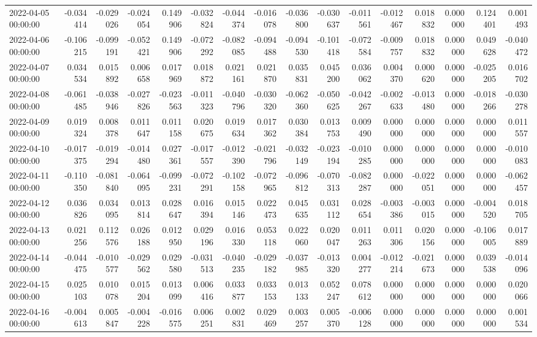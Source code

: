 \begin{tabular}{lrrrrrrrrrrrrrrr}
2022-04-05 00:00:00 & -0.034414 & -0.029026 & -0.024054 & 0.149906 & -0.032824 & -0.044374 & -0.016078 & -0.036800 & -0.030637 & -0.011561 & -0.012467 & 0.018832 & 0.000000 & 0.124401 & 0.001493 \\
2022-04-06 00:00:00 & -0.106215 & -0.099191 & -0.052421 & 0.149906 & -0.072292 & -0.082085 & -0.094488 & -0.094530 & -0.101418 & -0.072584 & -0.009757 & 0.018832 & 0.000000 & 0.049628 & -0.040472 \\
2022-04-07 00:00:00 & 0.034534 & 0.015892 & 0.006658 & 0.017969 & 0.018872 & 0.021161 & 0.021870 & 0.035831 & 0.045200 & 0.036062 & 0.004370 & 0.000620 & 0.000000 & -0.025205 & 0.016702 \\
2022-04-08 00:00:00 & -0.061485 & -0.038946 & -0.027826 & -0.023563 & -0.011323 & -0.040796 & -0.030320 & -0.062360 & -0.050625 & -0.042267 & -0.002633 & -0.013480 & 0.000000 & -0.018266 & -0.030278 \\
2022-04-09 00:00:00 & 0.019324 & 0.008378 & 0.011647 & 0.011158 & 0.020675 & 0.019634 & 0.017362 & 0.030384 & 0.013753 & 0.009490 & 0.000000 & 0.000000 & 0.000000 & 0.000000 & 0.011557 \\
2022-04-10 00:00:00 & -0.017375 & -0.019294 & -0.014480 & 0.027361 & -0.017557 & -0.012390 & -0.021796 & -0.032149 & -0.023194 & -0.010285 & 0.000000 & 0.000000 & 0.000000 & 0.000000 & -0.010083 \\
2022-04-11 00:00:00 & -0.110350 & -0.081840 & -0.064095 & -0.099231 & -0.072291 & -0.102158 & -0.072965 & -0.096812 & -0.070313 & -0.082287 & 0.000000 & -0.022051 & 0.000000 & 0.000000 & -0.062457 \\
2022-04-12 00:00:00 & 0.036826 & 0.034095 & 0.013814 & 0.028647 & 0.016394 & 0.015146 & 0.022473 & 0.045635 & 0.031112 & 0.028654 & -0.003386 & -0.003015 & 0.000000 & -0.004520 & 0.018705 \\
2022-04-13 00:00:00 & 0.021256 & 0.112576 & 0.026188 & 0.012950 & 0.029196 & 0.016330 & 0.053118 & 0.022060 & 0.020047 & 0.011263 & 0.011306 & 0.020156 & 0.000000 & -0.106005 & 0.017889 \\
2022-04-14 00:00:00 & -0.044475 & -0.010577 & -0.029562 & 0.029580 & -0.031513 & -0.040235 & -0.029182 & -0.037985 & -0.013320 & 0.004277 & -0.012214 & -0.021673 & 0.000000 & 0.039538 & -0.014096 \\
2022-04-15 00:00:00 & 0.025103 & 0.010078 & 0.015204 & 0.013099 & 0.006416 & 0.033877 & 0.033153 & 0.013133 & 0.052247 & 0.078612 & 0.000000 & 0.000000 & 0.000000 & 0.000000 & 0.020066 \\
2022-04-16 00:00:00 & -0.004613 & 0.005847 & -0.004228 & -0.016575 & 0.006251 & 0.002831 & 0.029469 & 0.003257 & 0.005370 & -0.006128 & 0.000000 & 0.000000 & 0.000000 & 0.000000 & 0.001534 \\

\end{tabular}
